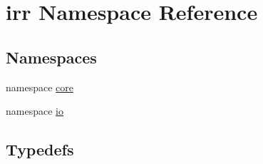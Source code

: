 \hypertarget{namespaceirr}{
\section{irr Namespace Reference}
\label{namespaceirr}
}
\subsection*{Namespaces}
\begin{CompactItemize}
\item 
namespace \hyperlink{namespaceirr_1_1core}{core}
\item 
namespace \hyperlink{namespaceirr_1_1io}{io}
\end{CompactItemize}
\subsection*{Typedefs}

